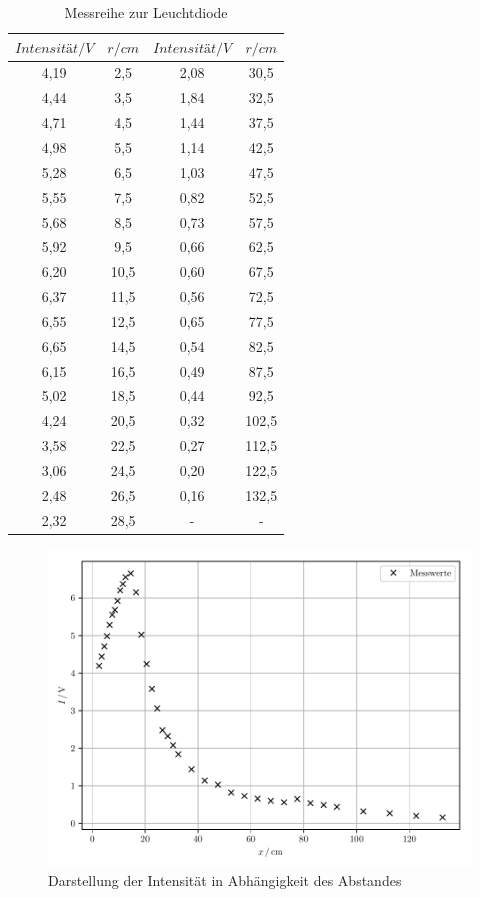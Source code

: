 \begin{table}[H]
\centering
\caption{Messreihe zur Leuchtdiode}
\label{tab:3}
 \begin{tabular}{c c| c c}
  \toprule
     $Intensität / V$ & $r / cm$ &  $Intensität / V$ & $r / cm$  \\
  \midrule
  4,19 & 2,5 & 2,08 & 30,5  \\
  4,44 & 3,5 & 1,84 & 32,5  \\
  4,71 & 4,5 & 1,44 & 37,5  \\
  4,98 & 5,5 & 1,14 & 42,5  \\
  5,28 & 6,5 & 1,03 & 47,5  \\
  5,55 & 7,5 & 0,82 & 52,5  \\
  5,68 & 8,5 & 0,73 & 57,5  \\
  5,92 & 9,5 & 0,66 & 62,5  \\
  6,20 & 10,5& 0,60 & 67,5  \\
  6,37 & 11,5& 0,56 & 72,5  \\
  6,55 & 12,5& 0,65 & 77,5  \\
  6,65 & 14,5& 0,54 & 82,5  \\
  6,15 & 16,5& 0,49 & 87,5  \\
  5,02 & 18,5& 0,44 & 92,5  \\
  4,24 & 20,5& 0,32 & 102,5 \\
  3,58 & 22,5& 0,27 & 112,5 \\
  3,06 & 24,5& 0,20 & 122,5 \\
  2,48 & 26,5& 0,16 & 132,5 \\
  2,32 & 28,5&   -  &  -    \\
  \bottomrule
\end{tabular}
\end{table}

\begin{figure}[H]
  \centering
	\includegraphics[width=\textwidth]{plot1.pdf}
  \caption{Darstellung der Intensität in Abhängigkeit des Abstandes}
  \label{abb:6}
\end{figure}

